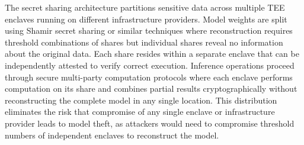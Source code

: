 The secret sharing architecture partitions sensitive data across multiple TEE enclaves running on different infrastructure providers. Model weights are split using Shamir secret sharing or similar techniques where reconstruction requires threshold combinations of shares but individual shares reveal no information about the original data. Each share resides within a separate enclave that can be independently attested to verify correct execution. Inference operations proceed through secure multi-party computation protocols where each enclave performs computation on its share and combines partial results cryptographically without reconstructing the complete model in any single location. This distribution eliminates the risk that compromise of any single enclave or infrastructure provider leads to model theft, as attackers would need to compromise threshold numbers of independent enclaves to reconstruct the model.

